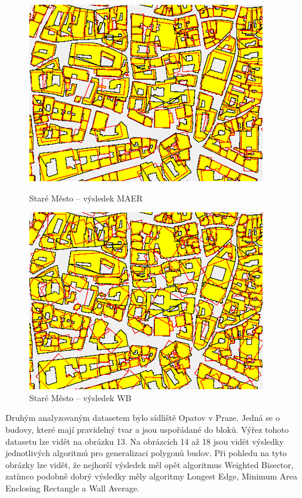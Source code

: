 \documentclass{article}
\begin{document}
\begin{spacing}{1.5}
\begin{figure}[htbp]
  \centering
  \begin{minipage}[b]{0.37\textwidth}
    \includegraphics[width=\textwidth]{images/SM_maer.png}
    \caption{Staré Město – výsledek MAER}
  \end{minipage}
  \hfill
  \begin{minipage}[b]{0.37\textwidth}
    \includegraphics[width=\textwidth]{images/SM_wb.png}
    \caption{Staré Město – výsledek WB}
  \end{minipage}
\end{figure}

\newpage
Druhým analyzovaným datasetem bylo sídliště Opatov v Praze. Jedná se o budovy, které mají pravidelný tvar a jsou uspořádané do bloků. Výřez tohoto datasetu lze vidět na obrázku 13. Na obrázcích 14 až 18 jsou vidět výsledky jednotlivých algoritmů pro generalizaci polygonů budov.  Při pohledu na tyto obrázky lze vidět, že nejhorší výsledek měl opět algoritmus Weighted Bisector, zatímco podobně dobrý výsledky měly algoritmy Longest Edge, Minimum Area Enclosing Rectangle a Wall Average.


\end{spacing}
\end{document}
